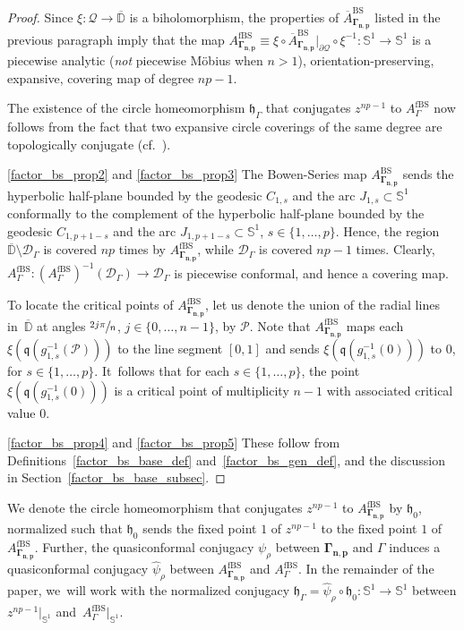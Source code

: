 \documentclass[10pt,a4paper]{amsart}
\newcommand{\cf}{cf.\ }
\theoremstyle{definition}
\theoremstyle{remark}
\newcommand{\D}{\mathbb{D}}
\begin{document}
\begin{proof}
Since $\xi:\mathcal{Q}\to\overline{\D}$ is a biholomorphism, the properties of $\overline{A}_{\pmb{\Gamma_{n,p}}}^{\mathrm{BS}}$ listed in the previous paragraph imply that the map $A_{\pmb{\Gamma_{n,p}}}^{\mathrm{fBS}}\equiv \xi\circ \overline{A}_{\pmb{\Gamma_{n,p}}}^{\mathrm{BS}}\vert_{\partial\mathcal{Q}}\circ\xi^{-1}:\mathbb{S}^1\to\mathbb{S}^1$ is a piecewise analytic (\emph{not} piecewise Möbius when $n>1$), orientation-preserving, expansive, covering map of degree $np-1$.

The existence of the circle homeomorphism $\mathfrak{h}_\Gamma$ that conjugates $z^{np-1}$ to $A_\Gamma^{\mathrm{fBS}}$ now follows from the fact that two expansive circle coverings of the same degree are topologically conjugate (\cf \cite[Property~(2'), p.\,99]{CR80}).

\eqref{factor_bs_prop2} and \eqref{factor_bs_prop3} The Bowen-Series map $A_{\pmb{\Gamma_{n,p}}}^{\mathrm{BS}}$ sends the hyperbolic half-plane bounded by the geodesic $C_{1,s}$ and the arc $J_{1,s}\subset\mathbb{S}^1$ conformally to the complement of the hyperbolic half-plane bounded by the geodesic $C_{1,p+1-s}$ and the arc $J_{1,p+1-s}\subset\mathbb{S}^1$, $s\in\{1,\dots,p\}$. Hence, the region $\overline{\D}\setminus\mathcal{D}_{\Gamma}$ is covered $np$ times by $A_{\pmb{\Gamma_{n,p}}}^{\mathrm{fBS}}$, while $\mathcal{D}_{\Gamma}$ is covered $np-1$ times. Clearly, $A_{\Gamma}^{\mathrm{fBS}}: \left(A_{\Gamma}^{\mathrm{fBS}}\right)^{-1}(\mathcal{D}_{\Gamma})\to \mathcal{D}_{\Gamma}$ is piecewise conformal, and hence a covering map.

To locate the critical points of $A_{\pmb{\Gamma_{n,p}}}^{\mathrm{fBS}}$, let us denote the union of the radial lines in~$\overline{\D}$ at angles $\sfrac{2j\pi}{n}$, $j\in\{0,\dots,n-1\}$, by $\mathcal{P}$. Note that $A_{\pmb{\Gamma_{n,p}}}^{\mathrm{fBS}}$ maps each $\xi(\mathfrak{q}(g_{1,s}^{-1}(\mathcal{P})))$ to the line segment $[0,1]$ and sends $\xi(\mathfrak{q}(g_{1,s}^{-1}(0)))$ to $0$, for $s\in\{1,\dots,p\}$. It~follows that for each $s\in\{1,\dots,p\}$, the point $\xi(\mathfrak{q}(g_{1,s}^{-1}(0)))$ is a critical point of multiplicity $n-1$ with associated critical value $0$.

\eqref{factor_bs_prop4} and \eqref{factor_bs_prop5} These follow from Definitions~\ref{factor_bs_base_def} and~\ref{factor_bs_gen_def}, and the discussion in Section~\ref{factor_bs_base_subsec}.
\end{proof}

We denote the circle homeomorphism that conjugates $z^{np-1}$ to $A_{\pmb{\Gamma_{n,p}}}^{\mathrm{fBS}}$ by $\mathfrak{h}_0$, normalized such that $\mathfrak{h}_0$ sends the fixed point $1$ of $z^{np-1}$ to the fixed point $1$ of $A_{\pmb{\Gamma_{n,p}}}^{\mathrm{fBS}}$. Further, the quasiconformal conjugacy $\psi_\rho$ between $\pmb{\Gamma_{n,p}}$ and $\Gamma$ induces a quasiconformal conjugacy $\widehat{\psi}_\rho$ between $A_{\pmb{\Gamma_{n,p}}}^{\mathrm{fBS}}$ and $A_{\Gamma}^{\mathrm{fBS}}$.
In the remainder of the paper, we~will work with the normalized conjugacy $\mathfrak{h}_\Gamma=\widehat{\psi}_\rho\circ\mathfrak{h}_0:\mathbb{S}^1\to\mathbb{S}^1$ between $z^{np-1}\vert_{\mathbb{S}^1}$ and~$A_{\Gamma}^{\mathrm{fBS}}\vert_{\mathbb{S}^1}$.
\end{document}
